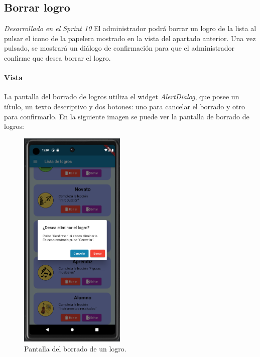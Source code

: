 \subsection{Borrar logro} 

\textit{Desarrollado en el Sprint 10}
El administrador podrá borrar un logro de la lista al pulsar el icono de la papelera mostrado en la vista del apartado anterior. Una vez pulsado, se mostrará un diálogo de confirmación para que el administrador confirme que desea borrar el logro.

\newpage
\paragraph*{Vista}
La pantalla del borrado de logros utiliza el widget \textit{AlertDialog}, que posee
un título, un texto descriptivo y dos botones: uno para cancelar el borrado y otro para confirmarlo.
En la siguiente imagen se puede ver la pantalla de borrado de logros:


\begin{figure}[H]
  \centering
  \includegraphics[width=0.45\textwidth]{imagenes/c7/borrarlogro.png}
  \caption{Pantalla del borrado de un logro.} 
  \label{fig:borradologro}
\end{figure}

